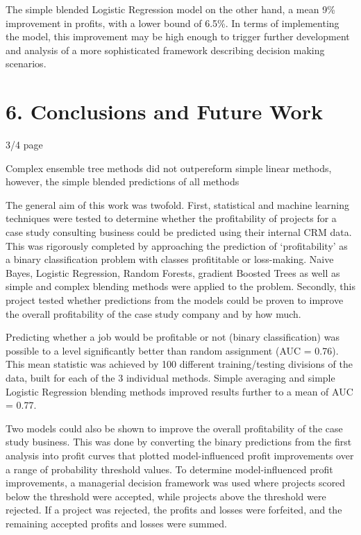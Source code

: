 \documentclass[]{elsarticle} %
\begin{document}
The simple blended Logistic Regression model on the other hand, a mean
9\% improvement in profits, with a lower bound of 6.5\%. In terms of
implementing the model, this improvement may be high enough to trigger
further development and analysis of a more sophisticated framework
describing decision making scenarios.

\section{6. Conclusions and Future
Work}\label{conclusions-and-future-work}

3/4 page

Complex ensemble tree methods did not outpereform simple linear methods,
however, the simple blended predictions of all methods

The general aim of this work was twofold. First, statistical and machine
learning techniques were tested to determine whether the profitability
of projects for a case study consulting business could be predicted
using their internal CRM data. This was rigorously completed by
approaching the prediction of `profitability' as a binary classification
problem with classes profititable or loss-making. Naive Bayes, Logistic
Regression, Random Forests, gradient Boosted Trees as well as simple and
complex blending methods were applied to the problem. Secondly, this
project tested whether predictions from the models could be proven to
improve the overall profitability of the case study company and by how
much.

Predicting whether a job would be profitable or not (binary
classification) was possible to a level significantly better than random
assignment (AUC = 0.76). This mean statistic was achieved by 100
different training/testing divisions of the data, built for each of the
3 individual methods. Simple averaging and simple Logistic Regression
blending methods improved results further to a mean of AUC = 0.77.

Two models could also be shown to improve the overall profitability of
the case study business. This was done by converting the binary
predictions from the first analysis into profit curves that plotted
model-influenced profit improvements over a range of probability
threshold values. To determine model-influenced profit improvements, a
managerial decision framework was used where projects scored below the
threshold were accepted, while projects above the threshold were
rejected. If a project was rejected, the profits and losses were
forfeited, and the remaining accepted profits and losses were summed.
\end{document}
